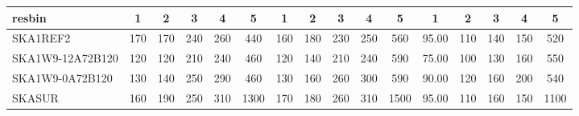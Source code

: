 \begin{table}[!htp]
{{\begin{tabular}{|lccccc||ccccc||ccccc|}
 resbin  &1 & 2 & 3 & 4 & 5 & 1 & 2 & 3 & 4 & 5 & 1 & 2 & 3 & 4 & 5 \tabularnewline \hline
SKA1REF2 & 170 \cellcolor{blue!60.00} & 170 \cellcolor{red!48.00} & 240 \cellcolor{green!49.50} & 260 \cellcolor{orange!30.00} & 440 \cellcolor{purple!18.00} & 160 \cellcolor{blue!51.60} & 180 \cellcolor{red!60.00} & 230 \cellcolor{green!34.80} & 250 \cellcolor{orange!24.00} & 560 \cellcolor{purple!18.00} & 95.00 \cellcolor{blue!60.00} & 110 \cellcolor{red!39.00} & 140 \cellcolor{green!32.00} & 150 \cellcolor{orange!18.00} & 520 \cellcolor{purple!18.00}\\ \hline 
SKA1W9-12A72B120 & 120 \cellcolor{blue!18.00} & 120 \cellcolor{red!18.00} & 210 \cellcolor{green!18.00} & 240 \cellcolor{orange!18.00} & 460 \cellcolor{purple!18.98} & 120 \cellcolor{blue!18.00} & 140 \cellcolor{red!18.00} & 210 \cellcolor{green!18.00} & 240 \cellcolor{orange!18.00} & 590 \cellcolor{purple!19.34} & 75.00 \cellcolor{blue!18.00} & 100 \cellcolor{red!18.00} & 130 \cellcolor{green!18.00} & 160 \cellcolor{orange!26.40} & 550 \cellcolor{purple!20.17}\\ \hline 
SKA1W9-0A72B120 & 130 \cellcolor{blue!26.40} & 140 \cellcolor{red!30.00} & 250 \cellcolor{green!60.00} & 290 \cellcolor{orange!48.00} & 460 \cellcolor{purple!18.98} & 130 \cellcolor{blue!26.40} & 160 \cellcolor{red!39.00} & 260 \cellcolor{green!60.00} & 300 \cellcolor{orange!54.00} & 590 \cellcolor{purple!19.34} & 90.00 \cellcolor{blue!49.50} & 120 \cellcolor{red!60.00} & 160 \cellcolor{green!60.00} & 200 \cellcolor{orange!60.00} & 540 \cellcolor{purple!19.45}\\ \hline 
SKASUR & 160 \cellcolor{blue!51.60} & 190 \cellcolor{red!60.00} & 250 \cellcolor{green!60.00} & 310 \cellcolor{orange!60.00} & 1300 \cellcolor{purple!60.00} & 170 \cellcolor{blue!60.00} & 180 \cellcolor{red!60.00} & 260 \cellcolor{green!60.00} & 310 \cellcolor{orange!60.00} & 1500 \cellcolor{purple!60.00} & 95.00 \cellcolor{blue!60.00} & 110 \cellcolor{red!39.00} & 160 \cellcolor{green!60.00} & 150 \cellcolor{orange!18.00} & 1100 \cellcolor{purple!60.00}\tabularnewline \hline 
\end{tabular}}\hfil 
{}}
\end{table}
